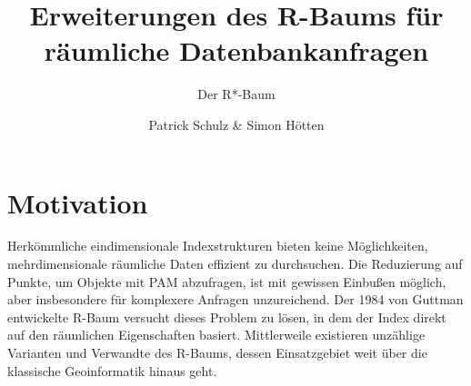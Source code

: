 \documentclass[runningheads,a4paper]{llncs}
\begin{document}
\mainmatter  %

\title{Erweiterungen des R-Baums für räumliche Datenbankanfragen}

\subtitle{Der R*-Baum}


\author{Patrick Schulz \& Simon Hötten}


\maketitle







\section{Motivation} %
\label{sec:intro}

	Herkömmliche eindimensionale Indexstrukturen bieten keine Möglichkeiten, mehrdimensionale räumliche Daten effizient zu durchsuchen. Die Reduzierung auf Punkte, um Objekte mit \ac{PAM} abzufragen, ist mit gewissen Einbußen möglich, aber insbesondere für komplexere Anfragen unzureichend.
	Der 1984 von Guttman entwickelte R-Baum \citep{Guttman:1984} versucht dieses Problem zu lösen, in dem der Index direkt auf den räumlichen Eigenschaften basiert. Mittlerweile existieren unzählige Varianten und Verwandte des R-Baums, dessen Einsatzgebiet weit über die klassische Geoinformatik hinaus geht.
\end{document}
